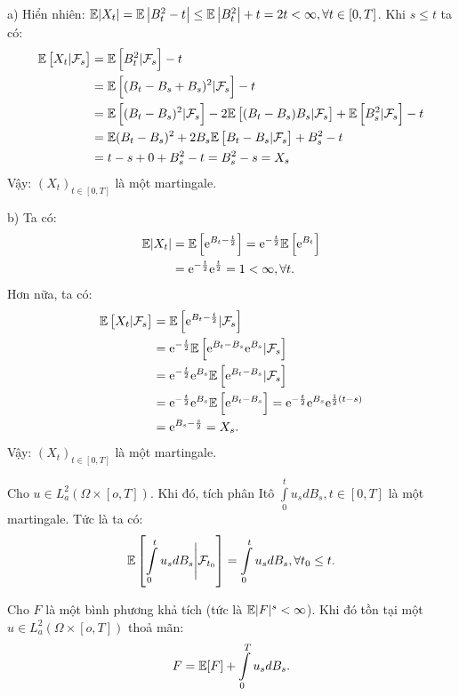 \begin{sol*}
    \item[a)] Hiển nhiên: $\mathbb{E}|X_t| = \mathbb{E}\left|B_t^2-t\right| \leq \mathbb{E}\left|B_t^2\right| + t = 2t < \infty, \forall t \in [0,T]$. Khi $s \leq t$ ta có:
    \begin{align*}
        \mathbb{E}\left[X_t|\mathcal{F}_s\right]&=\mathbb{E}\left[B_t^2|\mathcal{F}_s\right]-t\\
        &= \mathbb{E}\left[(B_t-B_s+B_s)^2|\mathcal{F}_s\right]-t\\
        &= \mathbb{E}\left[(B_t-B_s)^2|\mathcal{F}_s\right]-2\mathbb{E}\left[(B_t-B_s)B_s|\mathcal{F}_s\right] + \mathbb{E}\left[B_s^2|\mathcal{F}_s\right] -t\\
        &= \mathbb{E}(B_t-B_s)^2+2B_s\mathbb{E}\left[B_t-B_s|\mathcal{F}_s\right] +B_s^2-t\\
        &= t - s +0+B_s^2-t = B_s^2-s=X_s
    \end{align*}
    Vậy: $(X_t)_{t \in [0, T]}$ là một martingale.
    \item[b)] Ta có:
    \begin{align*}
        \mathbb{E}|X_t| &= \mathbb{E} \left[\mathrm{e}^{B_t - \frac{t}{2}} \right] = \mathrm{e}^{-\frac{t}{2}}\mathbb{E} \left[\mathrm{e}^{B_t}\right] \\
        &= \mathrm{e}^{-\frac{t}{2}} \mathrm{e}^{\frac{t}{2}} = 1 < \infty, \forall t.
    \end{align*}
    Hơn nữa, ta có:
    \begin{align*}
        \mathbb{E}\left[X_t|\mathcal{F}_s\right] &= \mathbb{E}\left[\mathrm{e}^{B_t-\frac{t}{2}} |\mathcal{F}_s\right]\\
        &= \mathrm{e}^{-\frac{t}{2}} \mathbb{E}\left[\mathrm{e}^{B_t-B_s}\mathrm{e}^{B_s} |\mathcal{F}_s\right]\\
        &= \mathrm{e}^{-\frac{t}{2}}\mathrm{e}^{B_s}  \mathbb{E}\left[\mathrm{e}^{B_t-B_s} |\mathcal{F}_s\right]\\
        &=  \mathrm{e}^{-\frac{t}{2}}\mathrm{e}^{B_s} \mathbb{E}\left[\mathrm{e}^{B_t-B_s}\right] =  \mathrm{e}^{-\frac{t}{2}}\mathrm{e}^{B_s} \mathrm{e}^{\frac{1}{2}(t-s)}\\
        &= \mathrm{e}^{B_s - \frac{s}{2}} = X_s.
    \end{align*}
    Vậy: $(X_t)_{t \in [0, T]}$ là một martingale.
\end{sol*}
\begin{thm}
    Cho \qtnn $u \in L_a^2 (\Omega \times [o,T])$. Khi đó, tích phân Itô $\int\limits_0^t u_s dB_s, t \in [0,T]$ là một martingale. Tức là ta có:
    \[ \mathbb{E} \left[\int\limits_0^t u_s dB_s \Bigg| \mathcal{F}_{t_0} \right] = \int\limits_0^t u_s dB_s, \forall t_0 \leq t. \]
\end{thm}
\begin{thm}
    Cho $F$ là một \bnn bình phương khả tích (tức là $\mathbb{E}|F|^s<\infty$). Khi đó tồn tại một \qtnn $u \in L_a^2 (\Omega \times [o,T])$ thoả mãn:
    \[F = \mathbb{E}[F] + \int\limits_0^T u_s dB_s.\]
\end{thm}
